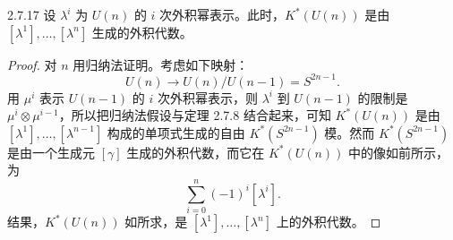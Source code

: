 \begin{theorem*}{2.7.17}
  设 $\lambda^i$ 为 $U(n)$ 的 $i$ 次外积幂表示。此时，$K^*(U(n))$ 是由 $[\lambda^1],\ldots,[\lambda^n]$ 生成的外积代数。
\end{theorem*}

\begin{proof}
  对 $n$ 用归纳法证明。考虑如下映射：
  \[
  U(n)\longrightarrow U(n)/U(n-1)=S^{2n-1}.
  \]
  用 $\mu^i$ 表示 $U(n-1)$ 的 $i$ 次外积幂表示，则 $\lambda^i$ 到 $U(n-1)$ 的限制是 $\mu^i\otimes\mu^{i-1}$，所以把归纳法假设与定理 2.7.8 结合起来，可知 $K^*(U(n))$ 是由 $[\lambda^1],\ldots,[\lambda^{n-1}]$ 构成的单项式生成的自由 $K^*(S^{2n-1})$ 模。然而 $K^*(S^{2n-1})$ 是由一个生成元 $[\gamma]$ 生成的外积代数，而它在 $K^*(U(n))$ 中的像如前所示，为
  \[
  \sum_{i=0}^{n}(-1)^i[\lambda^i].
  \]
  结果，$K^*(U(n))$ 如所求，是 $[\lambda^1],\ldots,[\lambda^n]$ 上的外积代数。
\end{proof}


